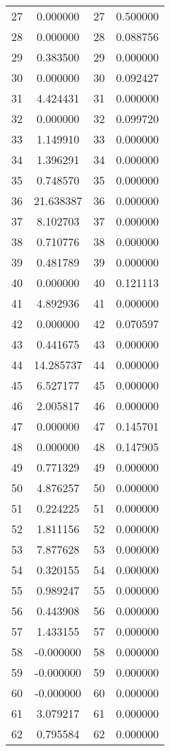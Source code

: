 \documentclass[12pt]{article}
\begin{document}
\begin{longtable}{@{}cccc@{}}
27 & 0.000000 & 27 & 0.500000 \\
28 & 0.000000 & 28 & 0.088756 \\
29 & 0.383500 & 29 & 0.000000 \\
30 & 0.000000 & 30 & 0.092427 \\
31 & 4.424431 & 31 & 0.000000 \\
32 & 0.000000 & 32 & 0.099720 \\
33 & 1.149910 & 33 & 0.000000 \\
34 & 1.396291 & 34 & 0.000000 \\
35 & 0.748570 & 35 & 0.000000 \\
36 & 21.638387 & 36 & 0.000000 \\
37 & 8.102703 & 37 & 0.000000 \\
38 & 0.710776 & 38 & 0.000000 \\
39 & 0.481789 & 39 & 0.000000 \\
40 & 0.000000 & 40 & 0.121113 \\
41 & 4.892936 & 41 & 0.000000 \\
42 & 0.000000 & 42 & 0.070597 \\
43 & 0.441675 & 43 & 0.000000 \\
44 & 14.285737 & 44 & 0.000000 \\
45 & 6.527177 & 45 & 0.000000 \\
46 & 2.005817 & 46 & 0.000000 \\
47 & 0.000000 & 47 & 0.145701 \\
48 & 0.000000 & 48 & 0.147905 \\
49 & 0.771329 & 49 & 0.000000 \\
50 & 4.876257 & 50 & 0.000000 \\
51 & 0.224225 & 51 & 0.000000 \\
52 & 1.811156 & 52 & 0.000000 \\
53 & 7.877628 & 53 & 0.000000 \\
54 & 0.320155 & 54 & 0.000000 \\
55 & 0.989247 & 55 & 0.000000 \\
56 & 0.443908 & 56 & 0.000000 \\
57 & 1.433155 & 57 & 0.000000 \\
58 & -0.000000 & 58 & 0.000000 \\
59 & -0.000000 & 59 & 0.000000 \\
60 & -0.000000 & 60 & 0.000000 \\
61 & 3.079217 & 61 & 0.000000 \\
62 & 0.795584 & 62 & 0.000000 \\

\end{longtable}
\end{document}
